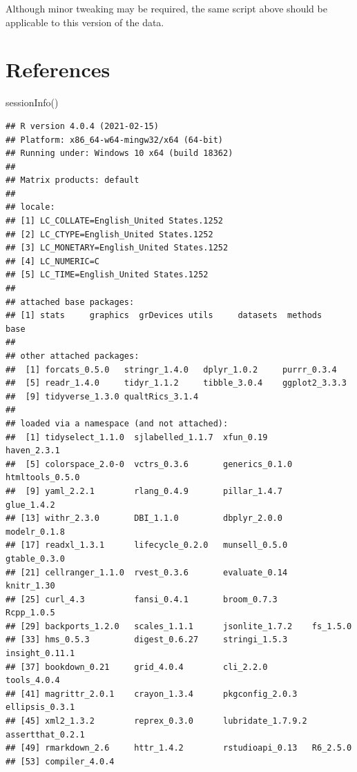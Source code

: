 \documentclass[
  english,
]{book}
\newenvironment{Shaded}{\begin{snugshade}}{\end{snugshade}}
\newcommand{\FunctionTok}[1]{\textcolor[rgb]{0.00,0.00,0.00}{#1}}
\newcommand{\NormalTok}[1]{#1}
\begin{document}
Although minor tweaking may be required, the same script above should be applicable to this version of the data.

\hypertarget{references}{%
\section{References}\label{references}}

\begin{Shaded}
\begin{Highlighting}[]
\FunctionTok{sessionInfo}\NormalTok{()}
\end{Highlighting}
\end{Shaded}

\begin{verbatim}
## R version 4.0.4 (2021-02-15)
## Platform: x86_64-w64-mingw32/x64 (64-bit)
## Running under: Windows 10 x64 (build 18362)
## 
## Matrix products: default
## 
## locale:
## [1] LC_COLLATE=English_United States.1252 
## [2] LC_CTYPE=English_United States.1252   
## [3] LC_MONETARY=English_United States.1252
## [4] LC_NUMERIC=C                          
## [5] LC_TIME=English_United States.1252    
## 
## attached base packages:
## [1] stats     graphics  grDevices utils     datasets  methods   base     
## 
## other attached packages:
##  [1] forcats_0.5.0   stringr_1.4.0   dplyr_1.0.2     purrr_0.3.4    
##  [5] readr_1.4.0     tidyr_1.1.2     tibble_3.0.4    ggplot2_3.3.3  
##  [9] tidyverse_1.3.0 qualtRics_3.1.4
## 
## loaded via a namespace (and not attached):
##  [1] tidyselect_1.1.0  sjlabelled_1.1.7  xfun_0.19         haven_2.3.1      
##  [5] colorspace_2.0-0  vctrs_0.3.6       generics_0.1.0    htmltools_0.5.0  
##  [9] yaml_2.2.1        rlang_0.4.9       pillar_1.4.7      glue_1.4.2       
## [13] withr_2.3.0       DBI_1.1.0         dbplyr_2.0.0      modelr_0.1.8     
## [17] readxl_1.3.1      lifecycle_0.2.0   munsell_0.5.0     gtable_0.3.0     
## [21] cellranger_1.1.0  rvest_0.3.6       evaluate_0.14     knitr_1.30       
## [25] curl_4.3          fansi_0.4.1       broom_0.7.3       Rcpp_1.0.5       
## [29] backports_1.2.0   scales_1.1.1      jsonlite_1.7.2    fs_1.5.0         
## [33] hms_0.5.3         digest_0.6.27     stringi_1.5.3     insight_0.11.1   
## [37] bookdown_0.21     grid_4.0.4        cli_2.2.0         tools_4.0.4      
## [41] magrittr_2.0.1    crayon_1.3.4      pkgconfig_2.0.3   ellipsis_0.3.1   
## [45] xml2_1.3.2        reprex_0.3.0      lubridate_1.7.9.2 assertthat_0.2.1 
## [49] rmarkdown_2.6     httr_1.4.2        rstudioapi_0.13   R6_2.5.0         
## [53] compiler_4.0.4
\end{verbatim}
\end{document}
